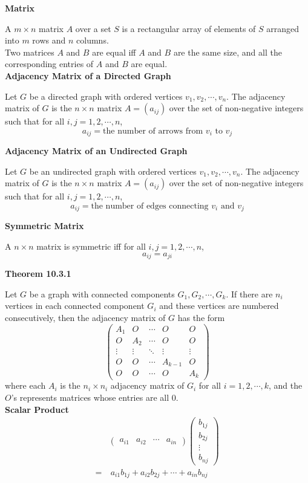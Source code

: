 \documentclass[a4paper]{article}
\newcommand{\subheading}[1]{{\scriptsize\textbf{#1}}}
\begin{document}
\begin{multicols*}{4}
\subheading{Matrix}

A $m \times n$ matrix $A$ over a set $S$ is a rectangular array of elements of
$S$ arranged into $m$ rows and $n$ columns.\\

Two matrices $A$ and $B$ are equal iff $A$ and $B$ are the same size, and all
the corresponding entries of $A$ and $B$ are equal.\\

\subheading{Adjacency Matrix of a Directed Graph}

Let $G$ be a directed graph with ordered vertices $v_1, v_2, \cdots, v_n$. The
adjacency matrix of $G$ is the $n \times n$ matrix $A = (a_{ij})$ over the set
of non-negative integers such that for all $i, j = 1,2,\cdots, n$,
$$a_{ij} = \text{the number of arrows from $v_i$ to $v_j$}$$

\subheading{Adjacency Matrix of an Undirected Graph}

Let $G$ be an undirected graph with ordered vertices $v_1, v_2, \cdots, v_n$.
The adjacency matrix of $G$ is the $n \times n$ matrix $A = (a_{ij})$ over the
set of non-negative integers such that for all $i, j = 1,2,\cdots, n$,
$$a_{ij} = \text{the number of edges connecting $v_i$ and $v_j$}$$

\subheading{Symmetric Matrix}

A $n \times n$ matrix is symmetric iff for all $i, j = 1, 2, \cdots, n$,
$$a_{ij} = a_{ji}$$

\subheading{Theorem 10.3.1}

Let $G$ be a graph with connected components $G_1, G_2, \cdots, G_k$. If there
are $n_i$ vertices in each connected component $G_i$ and these vertices are
numbered consecutively, then the adjacency matrix of $G$ has the form
$$\begin{pmatrix}
  A_1    & O      & \cdots & O       & O \\
  O      & A_2    & \cdots & O       & O \\
  \vdots & \vdots & \ddots & \vdots  & \vdots \\
  O      & O      & \cdots & A_{k-1} & O \\
  O      & O      & \cdots & O       & A_k
\end{pmatrix}$$
where each $A_i$ is the $n_i \times n_i$ adjacency matrix of $G_i$ for all $i =
1, 2, \cdots, k$, and the $O$'s represents matrices whose entries are all $0$.\\

\subheading{Scalar Product}
\begin{align*}
  &\begin{pmatrix} a_{i1} & a_{i2} & \cdots & a_{in} \end{pmatrix}
    \begin{pmatrix} b_{1j} \\ b_{2j} \\ \vdots \\ b_{nj} \end{pmatrix}\\
  = &\ a_{i1}b_{1j} + a_{i2}b_{2j} + \cdots + a_{in}b_{nj}
\end{align*}


\end{multicols*}
\end{document}
